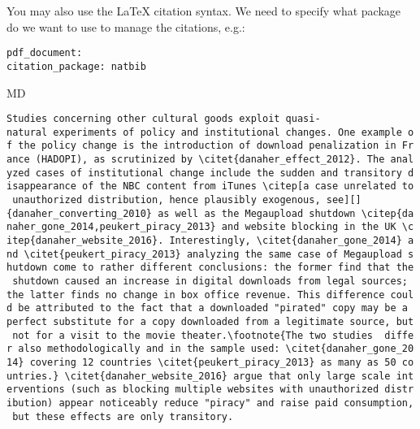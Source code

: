 \documentclass[
  11pt,
  ignorenonframetext,
]{article}
\begin{document}
\begin{frame}[fragile]

You may also use the LaTeX citation syntax. We need to specify what
package do we want to use to manage the citations, e.g.:

\texttt{pdf\_document:}\\
\texttt{citation\_package:\ natbib}

\begin{block}{MD}

\texttt{Studies\ concerning\ other\ cultural\ goods\ exploit\ quasi-natural\ experiments\ of\ policy\ and\ institutional\ changes.\ One\ example\ of\ the\ policy\ change\ is\ the\ introduction\ of\ download\ penalization\ in\ France\ (HADOPI),\ as\ scrutinized\ by\ \textbackslash{}citet\{danaher\_effect\_2012\}.\ The\ analyzed\ cases\ of\ institutional\ change\ include\ the\ sudden\ and\ transitory\ disappearance\ of\ the\ NBC\ content\ from\ iTunes\ \textbackslash{}citep{[}a\ case\ unrelated\ to\ unauthorized\ distribution,\ hence\ plausibly\ exogenous,\ see{]}{[}{]}\{danaher\_converting\_2010\}\ as\ well\ as\ the\ Megaupload\ shutdown\ \textbackslash{}citep\{danaher\_gone\_2014,peukert\_piracy\_2013\}\ and\ website\ blocking\ in\ the\ UK\ \textbackslash{}citep\{danaher\_website\_2016\}.\ Interestingly,\ \textbackslash{}citet\{danaher\_gone\_2014\}\ and\ \textbackslash{}citet\{peukert\_piracy\_2013\}\ analyzing\ the\ same\ case\ of\ Megaupload\ shutdown\ come\ to\ rather\ different\ conclusions:\ the\ former\ find\ that\ the\ shutdown\ caused\ an\ increase\ in\ digital\ downloads\ from\ legal\ sources;\ the\ latter\ finds\ no\ change\ in\ box\ office\ revenue.\ This\ difference\ could\ be\ attributed\ to\ the\ fact\ that\ a\ downloaded\ "pirated"\ copy\ may\ be\ a\ perfect\ substitute\ for\ a\ copy\ downloaded\ from\ a\ legitimate\ source,\ but\ not\ for\ a\ visit\ to\ the\ movie\ theater.\textbackslash{}footnote\{The\ two\ studies\ \ differ\ also\ methodologically\ and\ in\ the\ sample\ used:\ \textbackslash{}citet\{danaher\_gone\_2014\}\ covering\ 12\ countries\ \textbackslash{}citet\{peukert\_piracy\_2013\}\ as\ many\ as\ 50\ countries.\}\ \textbackslash{}citet\{danaher\_website\_2016\}\ argue\ that\ only\ large\ scale\ interventions\ (such\ as\ blocking\ multiple\ websites\ with\ unauthorized\ distribution)\ appear\ noticeably\ reduce\ "piracy"\ and\ raise\ paid\ consumption,\ but\ these\ effects\ are\ only\ transitory.}

\end{block}


\end{frame}
\end{document}
